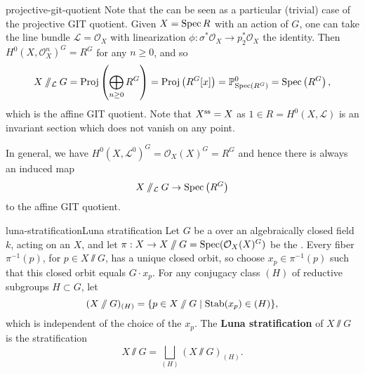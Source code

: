     
    

\begin{example}{projective-git-quotient}
    Note that the  can be seen as a particular (trivial) case of the projective GIT quotient. Given $X = \operatorname{Spec} R$ with an action of $G$, one can take the line bundle $\mathcal{L} = \mathcal{O}_X$ with linearization $\phi : \sigma^* \mathcal{O}_X \to p_2^* \mathcal{O}_X$ the identity. Then $H^0(X, \mathcal{O}_X^n)^G = R^G$ for any $n \ge 0$, and so
    \[ X \sslash_{\mathcal{L}} G = \operatorname{Proj} \left( \bigoplus_{n \ge 0} R^G \right) = \operatorname{Proj} \left( R^G[x] \right) = \mathbb{P}^0_{\operatorname{Spec} \left( R^G \right) } = \operatorname{Spec}\left( R^G \right) , \]
    which is the affine GIT quotient. Note that $X^\textup{ss} = X$ as $1 \in R = H^0(X, \mathcal{L})$ is an invariant section which does not vanish on any point.
    
    In general, we have $H^0(X, \mathcal{L}^0)^G = \mathcal{O}_X(X)^G = R^G$ and hence there is always an induced map
    \[ X \sslash_{\mathcal{L}} G \to \operatorname{Spec}\left( R^G \right) \]
    to the affine GIT quotient.
\end{example}

\begin{topic}{luna-stratification}{Luna stratification}
    Let $G$ be a  over an algebraically closed field $k$, acting on an   $X$, and let $\pi : X \to X \sslash G = \operatorname{Spec}(\mathcal{O}_X(X)^G)$ be the .
    Every fiber $\pi^{-1}(p)$, for $p \in X \sslash G$, has a unique closed orbit, so choose $x_p \in \pi^{-1}(p)$ such that this closed orbit equals $G \cdot x_p$. For any conjugacy class $(H)$ of reductive subgroups $H \subset G$, let 
    \[ (X \sslash G)_{(H)} = \{ p \in X \sslash G \mid \textup{Stab}(x_p) \in (H) \} , \]
    which is independent of the choice of the $x_p$. The \textbf{Luna stratification} of $X \sslash G$ is the stratification
    \[ X \sslash G = \bigsqcup_{(H)} (X \sslash G)_{(H)} . \]
\end{topic}


